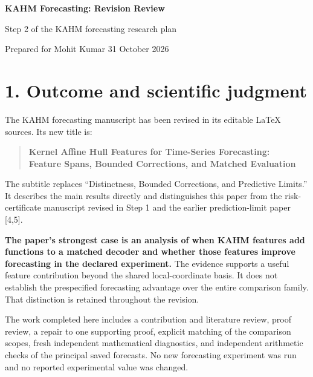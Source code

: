 \documentclass[11pt]{article}
\begin{document}
\thispagestyle{plain}
{\LARGE\bfseries KAHM Forecasting: Revision Review\par}
\vspace{5pt}
{\large Step 2 of the KAHM forecasting research plan\par}
Prepared for Mohit Kumar \hfill 31 October 2026

\section*{1. Outcome and scientific judgment}

The KAHM forecasting manuscript has been revised in its editable LaTeX
sources. Its new title is:
\begin{quote}
\textbf{Kernel Affine Hull Features for Time-Series Forecasting:\\
Feature Spans, Bounded Corrections, and Matched Evaluation}
\end{quote}
The subtitle replaces ``Distinctness, Bounded Corrections, and Predictive
Limits.'' It describes the main results directly and distinguishes this
paper from the risk-certificate manuscript revised in Step 1 and the
earlier prediction-limit paper [4,5].

\textbf{The paper's strongest case is an analysis of when KAHM features
add functions to a matched decoder and whether those features improve
forecasting in the declared experiment.} The evidence supports a useful
feature contribution beyond the shared local-coordinate basis. It does
not establish the prespecified forecasting advantage over the entire
comparison family. That distinction is retained throughout the revision.

The work completed here includes a contribution and literature review,
proof review, a repair to one supporting proof, explicit matching of the
comparison scopes, fresh independent mathematical diagnostics, and
independent arithmetic checks of the principal saved forecasts. No new
forecasting experiment was run and no reported experimental value was
changed.
\end{document}
